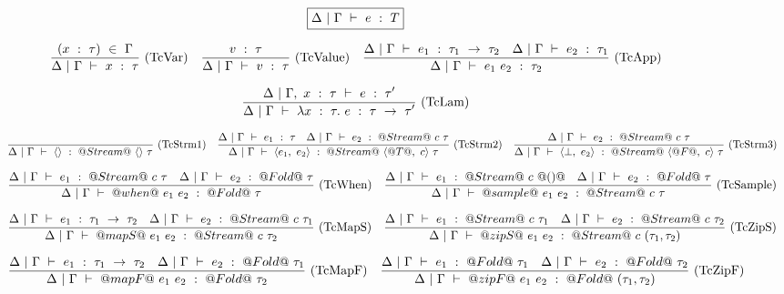 \begin{figure*}

$$
\boxed{\Delta~|~\Gamma ~\vdash~ e~:~T}
$$


$$
\enskip \frac {\displaystyle 
    (x~:~\tau)~\in~\Gamma
} {\displaystyle  
    \Delta~|~\Gamma ~\vdash~ x~:~\tau
} \  \mbox{(TcVar)} \enskip
\enskip \frac {\displaystyle 
    v~:~\tau
} {\displaystyle  
    \Delta~|~\Gamma ~\vdash~ v~:~\tau
} \  \mbox{(TcValue)} \enskip
\enskip \frac {\displaystyle 
    \Delta~|~\Gamma ~\vdash~ e_1~:~\tau_1~\to~\tau_2
    \quad
    \Delta~|~\Gamma ~\vdash~ e_2~:~\tau_1
} {\displaystyle  
    \Delta~|~\Gamma ~\vdash~ e_1~e_2~:~\tau_2
} \  \mbox{(TcApp)} \enskip
$$

$$
\enskip \frac {\displaystyle 
    \Delta~|~\Gamma,~x~:~\tau ~\vdash~ e~:~\tau'
} {\displaystyle 
    \Delta~|~\Gamma ~\vdash~ \lambda{}x~:~\tau.~e~:~\tau~\to~\tau'
} \  \mbox{(TcLam)} \enskip
$$

$$
\enskip \frac {\displaystyle } {\displaystyle 
    \Delta~|~\Gamma ~\vdash~ \langle \rangle~:~@Stream@~\langle\rangle~\tau
} \  \mbox{(TcStrm1)} \enskip
\enskip \frac {\displaystyle 
    \Delta~|~\Gamma ~\vdash~ e_1~:~\tau
    \quad
    \Delta~|~\Gamma ~\vdash~ e_2~:~@Stream@~c~\tau
} {\displaystyle 
    \Delta~|~\Gamma ~\vdash~ \langle e_1,~e_2 \rangle~:~@Stream@~\langle @T@,~c \rangle~\tau
} \  \mbox{(TcStrm2)} \enskip
\enskip \frac {\displaystyle 
    \Delta~|~\Gamma ~\vdash~ e_2~:~@Stream@~c~\tau
} {\displaystyle 
    \Delta~|~\Gamma ~\vdash~ \langle \bot,~e_2 \rangle~:~@Stream@~\langle @F@,~c \rangle~\tau
} \  \mbox{(TcStrm3)} \enskip
$$

$$
\enskip \frac {\displaystyle 
    \Delta~|~\Gamma ~\vdash~ e_1~:~@Stream@~c~\tau
    \quad
    \Delta~|~\Gamma ~\vdash~ e_2~:~@Fold@~\tau
} {\displaystyle 
    \Delta~|~\Gamma ~\vdash~ @when@~e_1~e_2~:~@Fold@~\tau
} \  \mbox{(TcWhen)} \enskip
\enskip \frac {\displaystyle 
    \Delta~|~\Gamma ~\vdash~ e_1~:~@Stream@~c~@()@
    \quad
    \Delta~|~\Gamma ~\vdash~ e_2~:~@Fold@~\tau
} {\displaystyle 
    \Delta~|~\Gamma ~\vdash~ @sample@~e_1~e_2~:~@Stream@~c~\tau
} \  \mbox{(TcSample)} \enskip
$$

$$
\enskip \frac {\displaystyle 
    \Delta~|~\Gamma ~\vdash~ e_1~:~\tau_1~\to~\tau_2
    \quad
    \Delta~|~\Gamma ~\vdash~ e_2~:~@Stream@~c~\tau_1
} {\displaystyle 
    \Delta~|~\Gamma ~\vdash~ @mapS@~e_1~e_2~:~@Stream@~c~\tau_2
} \  \mbox{(TcMapS)} \enskip
\enskip \frac {\displaystyle 
    \Delta~|~\Gamma ~\vdash~ e_1~:~@Stream@~c~\tau_1
    \quad
    \Delta~|~\Gamma ~\vdash~ e_2~:~@Stream@~c~\tau_2
} {\displaystyle 
    \Delta~|~\Gamma ~\vdash~ @zipS@~e_1~e_2~:~@Stream@~c~(\tau_1,\tau_2)
} \  \mbox{(TcZipS)} \enskip
$$

$$
\enskip \frac {\displaystyle 
    \Delta~|~\Gamma ~\vdash~ e_1~:~\tau_1~\to~\tau_2
    \quad
    \Delta~|~\Gamma ~\vdash~ e_2~:~@Fold@~\tau_1
} {\displaystyle 
    \Delta~|~\Gamma ~\vdash~ @mapF@~e_1~e_2~:~@Fold@~\tau_2
} \  \mbox{(TcMapF)} \enskip
\enskip \frac {\displaystyle 
    \Delta~|~\Gamma ~\vdash~ e_1~:~@Fold@~\tau_1
    \quad
    \Delta~|~\Gamma ~\vdash~ e_2~:~@Fold@~\tau_2
} {\displaystyle 
    \Delta~|~\Gamma ~\vdash~ @zipF@~e_1~e_2~:~@Fold@~(\tau_1,\tau_2)
} \  \mbox{(TcZipF)} \enskip
$$


\end{figure*}
